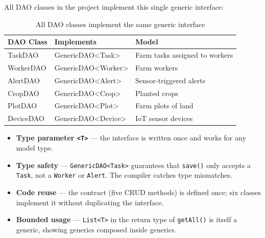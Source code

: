 \documentclass[12pt, a4paper]{report}
\begin{document}
All DAO classes in the project implement this single generic interface:

\begin{table}[H]
\centering
\renewcommand{\arraystretch}{1.5}
\begin{tabularx}{\textwidth}{>{\ttfamily}l >{\ttfamily}l X}
\toprule
\textbf{DAO Class} & \textbf{Implements} & \textbf{Model} \\
\midrule
TaskDAO    & GenericDAO<Task>          & Farm tasks assigned to workers \\
WorkerDAO  & GenericDAO<Worker>        & Farm workers \\
AlertDAO   & GenericDAO<Alert>         & Sensor-triggered alerts \\
CropDAO    & GenericDAO<Crop>          & Planted crops \\
PlotDAO    & GenericDAO<Plot>          & Farm plots of land \\
DeviceDAO  & GenericDAO<Device>        & IoT sensor devices \\
\bottomrule
\end{tabularx}
\caption{All DAO classes implement the same generic interface}
\end{table}

\begin{tcolorbox}[notebox, title={Generics Concepts Demonstrated}]
\begin{itemize}[noitemsep]
    \item \textbf{Type parameter \texttt{<T>}} --- the interface is written once and works for any model type.
    \item \textbf{Type safety} --- \texttt{GenericDAO<Task>} guarantees that \texttt{save()} only accepts a \texttt{Task}, not a \texttt{Worker} or \texttt{Alert}. The compiler catches type mismatches.
    \item \textbf{Code reuse} --- the contract (five CRUD methods) is defined once; six classes implement it without duplicating the interface.
    \item \textbf{Bounded usage} --- \texttt{List<T>} in the return type of \texttt{getAll()} is itself a generic, showing generics composed inside generics.
\end{itemize}
\end{tcolorbox}
\end{document}
